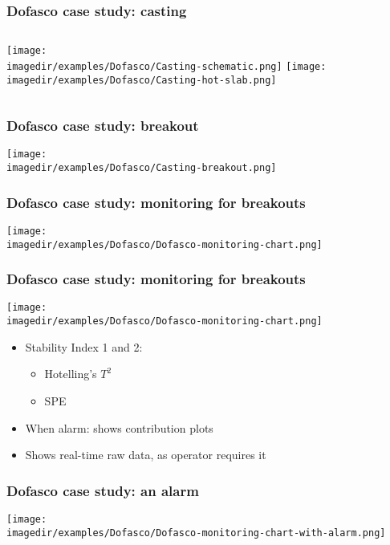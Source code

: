 \begin{frame}\frametitle{Dofasco case study: casting}
	\begin{columns}
		\column{5cm}
		\texttt{[image: \\imagedir/examples/Dofasco/Casting-schematic.png]} \column{5cm}
		\texttt{[image: \\imagedir/examples/Dofasco/Casting-hot-slab.png]}
	\end{columns}
\end{frame}

\begin{frame}\frametitle{Dofasco case study: breakout}

	\texttt{[image: \\imagedir/examples/Dofasco/Casting-breakout.png]}
\end{frame}

\begin{frame}\frametitle{Dofasco case study: monitoring for breakouts}

	\texttt{[image: \\imagedir/examples/Dofasco/Dofasco-monitoring-chart.png]}
\end{frame}

\begin{frame}\frametitle{Dofasco case study: monitoring for breakouts}

	\texttt{[image: \\imagedir/examples/Dofasco/Dofasco-monitoring-chart.png]}
	\begin{itemize}
		\item	Stability Index 1 and 2:
		\begin{itemize}
			\item	Hotelling's $T^2$
			\item	SPE
		\end{itemize}
		\item	When alarm: shows contribution plots
		\item	Shows real-time raw data, as operator requires it
	\end{itemize}
\end{frame}

\begin{frame}\frametitle{Dofasco case study: an alarm}

	\texttt{[image: \\imagedir/examples/Dofasco/Dofasco-monitoring-chart-with-alarm.png]}
\end{frame}

